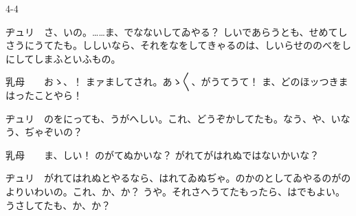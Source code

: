 \documentclass[tate,paper=b6j,jafontsize=9pt]{jlreq}
\begin{document}
\begin{azconvIndented}{4\zw}{-4\zw}

ヂュリ　さ、いの。……ま、でなないしてゐやる？ しいであらうとも、せめてしさうにうてたも。ししいなら、それをなをしてきゃるのは、しいらせののべをしにしてしまふといふもの。

乳母　　おゝ、！ まァましてされ。あゝ{〳〵}、がうてうて！ ま、どのほッつきまはったことやら！

ヂュリ　のをにっても、うがへしい。これ、どうぞかしてたも。なう、や、いなう、ぢゃぞいの？

乳母　　ま、しい！ のがてぬかいな？ がれてがはれぬではないかいな？

ヂュリ　がれてはれぬとやるなら、はれてゐぬぢゃ。のかのとしてゐやるのがのよりいわいの。これ、か、か？ うや。それさへうてたもったら、はでもよい。うさしてたも、か、か？


\end{azconvIndented}
\end{document}
